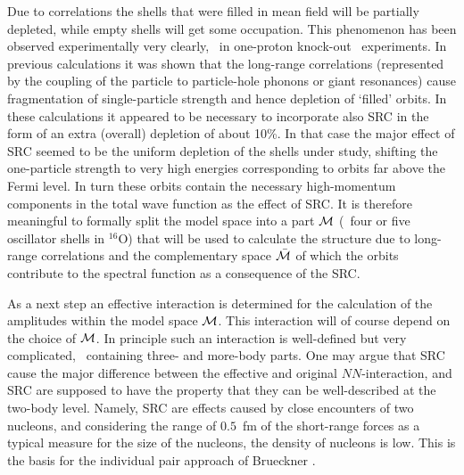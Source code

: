 Due to correlations
the shells that were filled in mean field will be partially depleted, while
empty shells will get some occupation. This phenomenon has been observed
experimentally very clearly, \eg\ in one-proton knock-out \eep\
experiments\cite{HBJ88,Ste91,Qu88a,Kr90}. In previous
calculations\cite{BRM91,RAD92} it was shown
that the long-range correlations (represented by the coupling of the particle
to particle-hole phonons or giant resonances) 
cause fragmentation of single-particle strength
and hence depletion of `filled' orbits. In these calculations it appeared to 
be necessary to incorporate also 
SRC in the form of an extra (overall) depletion of about 10\%.
In that case the major effect of SRC seemed to be the uniform depletion of 
the shells under study, shifting the one-particle strength to very
high energies corresponding to orbits far above the Fermi level. In turn
these orbits
contain the necessary high-momentum 
components in the total wave function as the effect of SRC.
 It is
therefore meaningful to
formally split the model space into a part $\calM$ (\eg\ four
or five oscillator shells in $^{16}$O) that will be used to 
calculate the structure due to long-range correlations and the complementary
space $\calbarM$ of which the orbits contribute to the spectral function
as a consequence of the SRC.

As a next step an effective interaction is determined for the calculation
of the amplitudes within the model space $\calM$. This interaction will of 
course depend on
the choice of $\calM$. In principle such an interaction is well-defined%
\cite{Br67a,JB71,Kuo74,EO77} but very complicated, 
\eg\ containing 
three- and more-body parts. One may argue that
SRC cause the major difference between the effective and original 
$NN$-interaction, and SRC are supposed to have the property that they can
be well-described at the two-body level. Namely, SRC are effects
caused by close encounters of two nucleons, and considering the range
of $0.5$~fm of the short-range forces as a typical measure for the size of
the nucleons, the density of nucleons is low. 
This is the basis for the
individual pair approach of Brueckner \etal\cite{BGW58,BLR61}.

